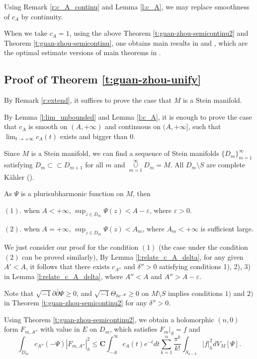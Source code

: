 Using Remark \ref{r:c_A_continu} and Lemma \ref{l:c_A}, we may
replace smoothness of $c_{A}$ by continuity.

When we take $c_{A}=1$, using the above Theorem
\ref{t:guan-zhou-semicontinu2} and Theorem
\ref{t:guan-zhou-semicontinu}, one obtains main results in
\cite{guan-zhou12a} and \cite{guan-zhou12p}, which are the optimal
estimate versions of main theorems in \cite{ohsawa4,ohsawa5}.

\subsection{Proof of Theorem \ref{t:guan-zhou-unify}}

By Remark \ref{r:extend}, it suffices to prove the case that $M$ is a Stein manifold.

By Lemma \ref{l:lim_unbounded} and Lemma \ref{l:c_A}, it is enough
to prove the case that $c_{A}$ is smooth on $(A,+\infty)$ and
continuous on $(A,+\infty]$, such that $\lim_{t\to +\infty}c_{A}(t)$
exists and bigger than $0$.

Since $M$ is a Stein manifold, we can find a sequence of Stein
manifolds $\{D_m\}_{m=1}^\infty$ satisfying $D_m\subset\subset
D_{m+1}$ for all $m$ and
$\overset{\infty}{\underset{m=1}{\cup}}D_m=M$. All $D_{m}\setminus
S$ are complete K\"{a}hler (\cite{grauert}).

As $\Psi$ is a plurisubharmonic function on $M$,
then

$(1).$ when $A<+\infty$, $\sup_{z\in D_{m}}\Psi(z)<A-\varepsilon$,
where $\varepsilon>0$.

$(2).$ when $A=+\infty$, $\sup_{z\in D_{m}}\Psi(z)<A_{m}$,
where $A_{m}<+\infty$ is sufficient large.

We just consider our proof for the condition $(1)$ (the case under
the condition $(2)$ can be proved similarly), By Lemma
\ref{l:relate_c_A_delta}, for any given $A'<A$, it follows that
there exists $c_{A''}$ and $\delta''>0$ satisfying conditions 1),
2), 3) in Lemma \ref{l:relate_c_A_delta}, where $A''<A$ and
$A''>A-\varepsilon$.

Note that $\sqrt{-1}\partial\bar\partial\Psi\geq0$, and
$\sqrt{-1}\Theta_{he^{-\Psi}}\geq0$ on $M\setminus S$ implies
conditions $1)$ and $2)$ in Theorem \ref{t:guan-zhou-semicontinu2}
for any $\delta''>0$.

Using Theorem \ref{t:guan-zhou-semicontinu2}, we obtain a
holomorphic $(n,0)$ form $F_{m,A''}$ with value in $E$ on $D_{m}$,
which satisfies $F_{m}|_{S}=f$ and
$$\int_{D_{m}}c_{A''}(-\Psi)|F_{m,A''}|^{2}_{h}
\leq\mathbf{C}\int_{-A}^{\infty}c_{A}(t)e^{-t}dt\sum_{k=1}^{n}\frac{\pi^{k}}{k!}\int_{S_{n-k}}|f|^{2}_{h}dV_{M}[\Psi].$$

